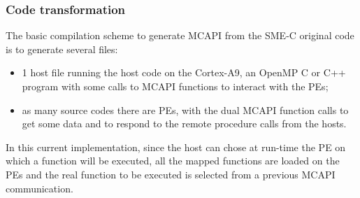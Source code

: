 \documentclass[a4paper]{article}
\begin{document}
\subsubsection{Code transformation}
\label{sec:code-transformation}

The basic compilation scheme to generate MCAPI from the SME-C original
code is to generate several files:
\begin{itemize}
\item 1 host file running the host code on the Cortex-A9, an OpenMP C or
  C++ program with some calls to MCAPI functions to interact with the PEs;
\item as many source codes there are PEs, with the dual MCAPI function
  calls to get some data and to respond to the remote procedure calls from
  the hosts.
\end{itemize}

In this current implementation, since the host can chose at run-time the
PE on which a function will be executed, all the mapped functions are
loaded on the PEs and the real function to be executed is selected from a
previous MCAPI communication.
\end{document}
